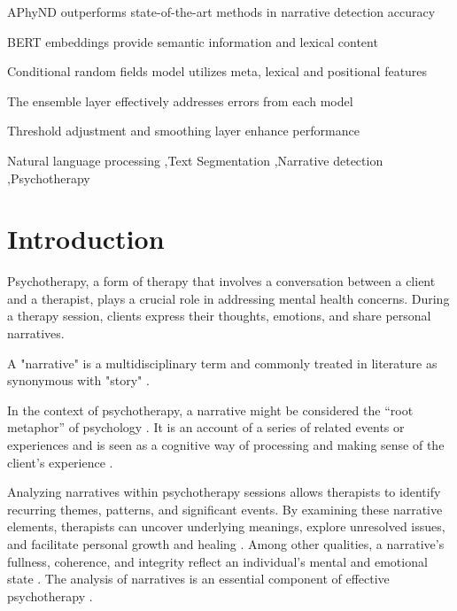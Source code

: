 \documentclass[preprint,12pt]{elsarticle}
\begin{document}
\begin{frontmatter}
\begin{highlights}
\item APhyND outperforms state-of-the-art methods in narrative detection accuracy
\item BERT embeddings provide semantic information and lexical content
\item Conditional random fields model utilizes meta, lexical and positional features
\item The ensemble layer effectively addresses errors from each model
\item Threshold adjustment and smoothing layer enhance performance
\end{highlights}

\begin{keyword}


Natural language processing  \sep Text Segmentation \sep Narrative detection \sep Psychotherapy
\end{keyword}

\end{frontmatter}

\section{Introduction}
Psychotherapy, a form of therapy that involves a conversation between a client and a therapist, plays a crucial role in addressing mental health concerns. During a therapy session, clients express their thoughts, emotions, and share personal narratives. 

A "narrative" is a multidisciplinary term and commonly treated in literature as synonymous with "story" \cite{norambuena2023survey}. 

In the context of psychotherapy, a narrative might be considered the “root metaphor” of psychology \cite{sarbin1986narrative}. It is an account of a series of related events or experiences and is seen as a cognitive way of processing and making sense of the client's experience \cite{hetrick2015back}.

Analyzing narratives within psychotherapy sessions allows therapists to identify recurring themes, patterns, and significant events. By examining these narrative elements, therapists can uncover underlying meanings, explore unresolved issues, and facilitate personal growth and healing  \cite{wong2018narrative}.  Among other qualities, a narrative's fullness, coherence, and integrity reflect an individual's mental and emotional state \cite{duero2018phenomenological}. The analysis of narratives is an essential component of effective psychotherapy  \cite{botella2011narrative}. 
\end{document}
